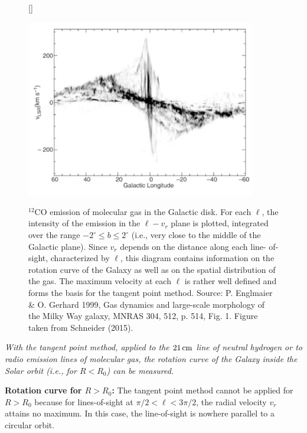 \documentclass[a4paper,10pt]{article}
\begin{document}
\begin{figure}[h]
    [\FBwidth]
    {\caption{\footnotesize{$^{12}$CO emission of molecular gas in the Galactic disk. For each $\ell$, the intensity of the emission in the $\ell-v_r$ plane is plotted, integrated over the range $-2^\circ\leq b \leq2^\circ$ (i.e., very close to the middle of the Galactic plane). Since $v_r$ depends on the distance along each line- of-sight, characterized by $\ell$, this diagram contains information on the rotation curve of the Galaxy as well as on the spatial distribution of the gas. The maximum velocity at each $\ell$ is rather well defined and forms the basis for the tangent point method. Source: P. Englmaier \& O. Gerhard 1999, Gas dynamics and large-scale morphology of the Milky Way galaxy, MNRAS 304, 512, p. 514, Fig. 1. Figure taken from Schneider (2015).}}
    \label{fig:vLSRvslong}}
    {\includegraphics[width=10cm]{figures/vLSRvslong.png}}
\end{figure}

{\noindent}\textit{With the tangent point method, applied to the $21\,{\rm cm}$ line of neutral hydrogen or to radio emission lines of molecular gas, the rotation curve of the Galaxy inside the Solar orbit (i.e., for $R<R_0$) can be measured.}

{\noindent}\textbf{Rotation curve for $R>R_0$:} The tangent point method cannot be applied for $R>R_0$ because for lines-of-sight at $\pi/2<\ell<3\pi/2$, the radial velocity $v_r$ attains no maximum. In this case, the line-of-sight is nowhere parallel to a circular orbit. 
\end{document}
